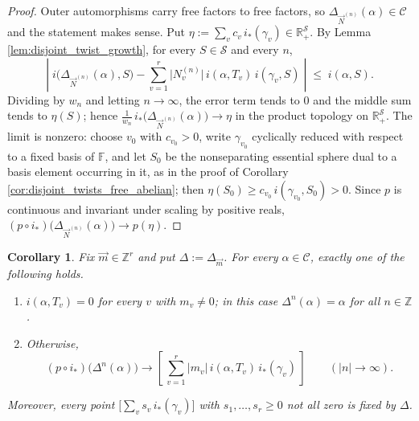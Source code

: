\documentclass[12pt,a4paper]{amsart}
\numberwithin{equation}{section}
\newcommand{\FF}{\mathbb{F}}
\newcommand{\ZZ}{\mathbb{Z}}
\theoremstyle{plain}
\newtheorem{corollary}[theorem]{Corollary}
\theoremstyle{definition}
\theoremstyle{remark}
\begin{document}
\begin{proof}
    Outer automorphisms carry free factors to free factors, so
    $\Delta_{\vec N^{(n)}}(\alpha) \in \mathcal{C}$ and the statement makes sense.
    Put $\eta := \sum_v c_v \, i_*(\gamma_v) \in \mathbb{R}_+^{\mathcal{S}}$.
    By Lemma \ref{lem:disjoint_twist_growth}, for every $S \in \mathcal{S}$ and every $n$,
    \[
        \left\lvert\; i\bigl(\Delta_{\vec N^{(n)}}(\alpha), S\bigr)
        - \sum_{v=1}^{r} \lvert N_v^{(n)} \rvert \, i(\alpha, T_v)\, i(\gamma_v, S)
        \;\right\rvert \;\le\; i(\alpha, S).
    \]
    Dividing by $w_n$ and letting $n \to \infty$, the error term tends to $0$ and the
    middle sum tends to $\eta(S)$; hence
    $\tfrac{1}{w_n}\, i_*\bigl(\Delta_{\vec N^{(n)}}(\alpha)\bigr) \to \eta$
    in the product topology on $\mathbb{R}_+^{\mathcal{S}}$.
    The limit is nonzero: choose $v_0$ with $c_{v_0} > 0$, write $\gamma_{v_0}$
    cyclically reduced with respect to a fixed basis of $\FF$, and let $S_0$ be the
    nonseparating essential sphere dual to a basis element occurring in it, as in the
    proof of Corollary \ref{cor:disjoint_twists_free_abelian}; then
    $\eta(S_0) \ge c_{v_0}\, i(\gamma_{v_0}, S_0) > 0$.
    Since $p$ is continuous and invariant under scaling by positive reals,
    $(p \circ i_*)\bigl(\Delta_{\vec N^{(n)}}(\alpha)\bigr) \to p(\eta)$.
\end{proof}

\begin{corollary}\label{cor:multitwist-parabolic}
    Fix $\vec m \in \ZZ^r$ and put $\Delta := \Delta_{\vec m}$.
    For every $\alpha \in \mathcal{C}$, exactly one of the following holds.
    \begin{enumerate}
        \item \label{enum:multi-para:1} $i(\alpha, T_v) = 0$ for every $v$ with $m_v \ne 0$; in this case
              $\Delta^n(\alpha) = \alpha$ for all $n \in \ZZ$.
        \item \label{enum:multi-para:2} Otherwise,
        \[
            (p \circ i_*)\bigl(\Delta^{n}(\alpha)\bigr)
            \longrightarrow
            \left[\, \sum_{v=1}^{r} \lvert m_v \rvert \, i(\alpha, T_v)\, i_*(\gamma_v) \,\right]
            \qquad (\lvert n \rvert \to \infty).
        \]
    \end{enumerate}
    Moreover, every point $\bigl[\sum_v s_v\, i_*(\gamma_v)\bigr]$ with
    $s_1, \dots, s_r \ge 0$ not all zero is fixed by $\Delta$.
\end{corollary}
\end{document}

